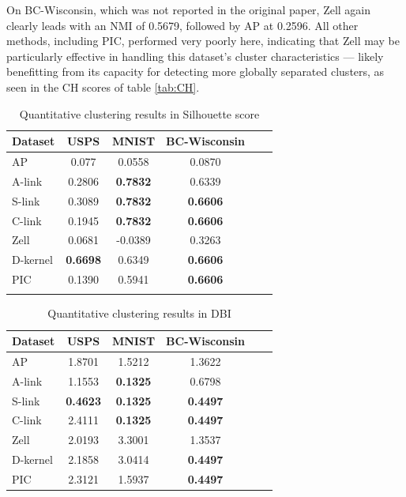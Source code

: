 \documentclass[
	10pt,
	parskip=half-,	
	paper=a4,
	english
	]{scrartcl}
\begin{document}
On BC-Wisconsin, which was not reported in the original paper, Zell again clearly leads with an NMI of 0.5679, followed by AP at 0.2596. All other methods, including PIC, performed very poorly here, indicating that Zell may be particularly effective in handling this dataset's cluster characteristics — likely benefitting from its capacity for detecting more globally separated clusters, as seen in the CH scores of table \ref{tab:CH}.

\begin{table}[h]
    \centering
    \caption{Quantitative clustering results in Silhouette score}
    \begin{tabular}{lccccc}
    \toprule
    \textbf{Dataset} & \textbf{USPS} & \textbf{MNIST} & \textbf{BC-Wisconsin} \\
    \midrule
    AP       & 0.077   & 0.0558 & 0.0870 \\
    A-link   & 0.2806  & \textbf{0.7832} & 0.6339  \\
    S-link   & 0.3089   & \textbf{0.7832} & \textbf{0.6606} \\
    C-link   & 0.1945   & \textbf{0.7832} & \textbf{0.6606} \\
    Zell     & 0.0681   & -0.0389 & 0.3263 \\
    D-kernel & \textbf{0.6698}   & 0.6349 & \textbf{0.6606} \\
    PIC      & 0.1390  & 0.5941 & \textbf{0.6606} \\
    \bottomrule
    \label{tab:Silhouette}
    \end{tabular}
\end{table}

\begin{table}[h]
    \centering
    \caption{Quantitative clustering results in DBI}
    \begin{tabular}{lccccc}
    \toprule
    \textbf{Dataset} & \textbf{USPS} & \textbf{MNIST} & \textbf{BC-Wisconsin} \\
    \midrule
    AP       & 1.8701   & 1.5212 & 1.3622 \\
    A-link   & 1.1553  & \textbf{0.1325} & 0.6798 \\
    S-link   & \textbf{0.4623}   & \textbf{0.1325} & \textbf{0.4497} \\
    C-link   & 2.4111   & \textbf{0.1325} & \textbf{0.4497} \\
    Zell     & 2.0193   & 3.3001 & 1.3537 \\
    D-kernel & 2.1858   & 3.0414 & \textbf{0.4497} \\
    PIC     & 2.3121    & 1.5937 & \textbf{0.4497} \\
    \bottomrule
    \end{tabular}
    \label{tab:DBI}
\end{table}
\end{document}
